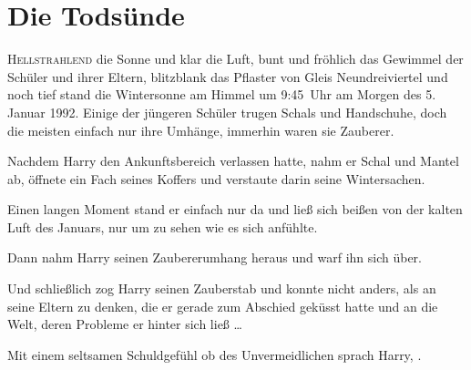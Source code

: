 \chapter{Die Todsünde}

\lettrine{H}{ellstrahlend} die Sonne und klar die Luft, bunt und fröhlich das Gewimmel der Schüler und ihrer Eltern, blitzblank das Pflaster von Gleis Neundreiviertel und noch tief stand die Wintersonne am Himmel um 9:45~Uhr am Morgen des 5. Januar 1992. Einige der jüngeren Schüler trugen Schals und Handschuhe, doch die meisten einfach nur ihre Umhänge, immerhin waren sie Zauberer.

Nachdem Harry den Ankunftsbereich verlassen hatte, nahm er Schal und Mantel ab, öffnete ein Fach seines Koffers und verstaute darin seine Wintersachen.

Einen langen Moment stand er einfach nur da und ließ sich beißen von der kalten Luft des Januars, nur um zu sehen wie es sich anfühlte.

Dann nahm Harry seinen Zaubererumhang heraus und warf ihn sich über.

Und schließlich zog Harry seinen Zauberstab und konnte nicht anders, als an seine Eltern zu denken, die er gerade zum Abschied geküsst hatte und an die Welt, deren Probleme er hinter sich ließ …

Mit einem seltsamen Schuldgefühl ob des Unvermeidlichen sprach Harry, .

